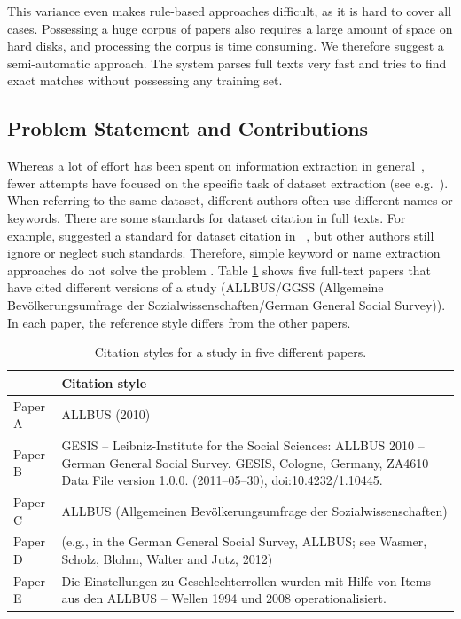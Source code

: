 \documentclass{IOS-Book-Article}
\begin{document}
This variance even makes rule-based approaches difficult, as it is hard to cover all cases. Possessing a huge corpus of papers also requires a large amount of space on hard disks, and processing the corpus is time consuming.
We therefore suggest a semi-automatic approach. The system parses full texts very fast and tries to find exact matches without possessing any training set. 

\subsection{Problem Statement and Contributions}
Whereas a lot of effort has been spent on information extraction in general~\citep{Sarawagi2007}, fewer attempts have focused on the specific task of dataset extraction (see e.g.~\citep{MeiyuLu2012}). When referring to the same dataset, different authors often use different names or keywords. 
There are some standards for dataset citation in full texts. For example, \citeauthor{altman2007proposed} suggested a standard for dataset citation in ~\citeyearpar{altman2007proposed}, but other authors still ignore or neglect such standards.
Therefore, simple keyword or name extraction approaches do not solve the problem \citep{Nadeau2007}. 
Table \ref{table:citation-variety} shows five full-text papers that have cited different versions of a study (ALLBUS/GGSS (Allgemeine Bev\"olkerungsumfrage der Sozialwissenschaften/German General Social Survey)). In each paper, the reference style differs from the other papers. 

\begin{table}[h!]
	\renewcommand{\arraystretch}{2}
	\centering
	\begin{tabular}{p{2.5cm}p{7cm}}
		\hline
		& Citation style \\
		\hline
		Paper A  & ALLBUS (2010)\\
		
		Paper B  & GESIS -- Leibniz-Institute for the Social Sciences: ALLBUS 2010 -- German General Social Survey. GESIS, Cologne, Germany, ZA4610 Data File version 1.0.0. (2011--05--30), doi:10.4232/1.10445. \\ 
		
		Paper C & ALLBUS (Allgemeinen Bev\"olkerungsumfrage der Sozialwissenschaften)\\
		
		Paper D & (e.g., in the German General Social Survey, ALLBUS; see Wasmer, Scholz, Blohm, Walter and Jutz, 2012)\\
		
		Paper E & Die Einstellungen zu Geschlechterrollen wurden mit Hilfe von Items aus den ALLBUS -- Wellen 1994 und 2008 operationalisiert.\\\hline
	\end{tabular}
	\caption{Citation styles for a study in five different papers.}
	\label{table:citation-variety}
\end{table}
\end{document}
